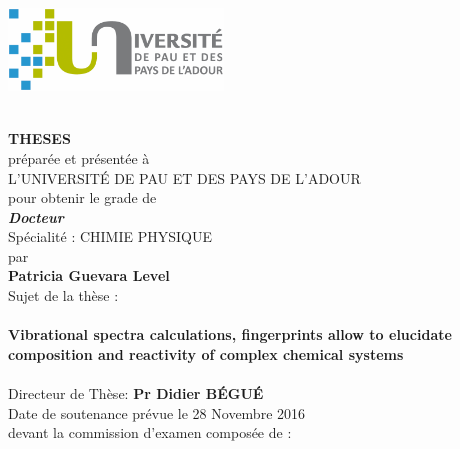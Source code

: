 \documentclass[12pt,a4paper]{book}
\begin{document}
\thispagestyle{empty}
\begin{center}
\includegraphics[height=2.2cm]{logo/uppa.png}
\end{center}
\begin{center}
	\hbox{}\setlength{\baselineskip}{13pt}~\\
	{\Large{\textbf{THESES}}}\\[\baselineskip]
	préparée et présentée à \\[\baselineskip]
	L'UNIVERSIT\'E DE PAU ET DES PAYS DE L'ADOUR \\[\baselineskip]
	pour obtenir le grade de\\[\baselineskip]
		{\Large\textit{{\textbf{Docteur}}}}\\[\baselineskip]
	Spécialité : CHIMIE PHYSIQUE \\[\baselineskip]
	par\\[\baselineskip]
  	\baselineskip=20pt
	{\LARGE{\textbf{Patricia Guevara Level}}}\\
	Sujet de la thèse :\\
	\hbox{}
	\setlength{\baselineskip}{4pt}
	\hbox{}\setlength{\baselineskip}{10pt}~\\
	\vspace*{-5pt}
	{\Large\textbf{Vibrational spectra calculations, fingerprints allow to elucidate composition and reactivity of complex chemical systems}}~\\[\baselineskip]
	\hbox{}~\\
	
	Directeur de Thèse: \textbf{Pr Didier B\'EGU\'E}\\[\baselineskip]
	Date de soutenance prévue le 28 Novembre 2016\\[\baselineskip]
	devant la commission d'examen composée de :\\[\baselineskip]~\\[\baselineskip] 
	
	\JURY
\end{center}
\end{document}
